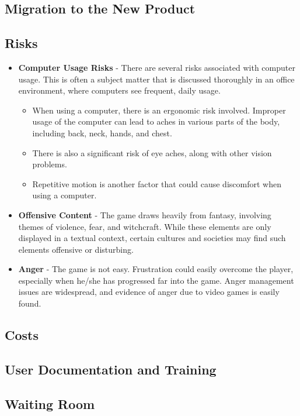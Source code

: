 \documentclass[12pt, titlepage]{article}
\begin{document}
	\subsection{Migration to the New Product}

	\subsection{Risks}

	\begin{itemize}
		\item \textbf{Computer Usage Risks} - There are several risks associated with computer usage. This is often a subject matter that is discussed thoroughly in an office environment, where computers see frequent, daily usage.
		\begin{itemize}
			\item When using a computer, there is an ergonomic risk involved. Improper usage of the computer can lead to aches in various parts of the body, including back, neck, hands, and chest.
			\item There is also a significant risk of eye aches, along with other vision problems.
			\item Repetitive motion is another factor that could cause discomfort when using a computer.
		\end{itemize}
		\item \textbf{Offensive Content} - The game draws heavily from fantasy, involving themes of violence, fear, and witchcraft. While these elements are only displayed in a textual context, certain cultures and societies may find such elements offensive or disturbing.
		\item \textbf{Anger} - The game is not easy. Frustration could easily overcome the player, especially when he/she has progressed far into the game. Anger management issues are widespread, and evidence of anger due to video games is easily found.
	\end{itemize}

	\subsection{Costs}

	

	\subsection{User Documentation and Training}

	\subsection{Waiting Room}
\end{document}
